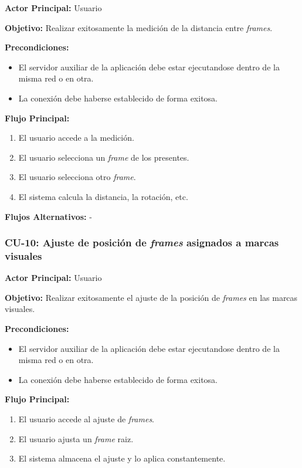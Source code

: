 \textbf{Actor Principal:} Usuario

\textbf{Objetivo:}
Realizar exitosamente la medición de la distancia entre \textit{frames}.

\textbf{Precondiciones:}
\begin{itemize}
    \item El servidor auxiliar de la aplicación debe estar ejecutandose dentro de la misma red o en otra. 
    \item La conexión debe haberse establecido de forma exitosa.
\end{itemize}

\textbf{Flujo Principal:}
\begin{enumerate}
    \item El usuario accede a la medición.
    \item El usuario selecciona un \textit{frame} de los presentes.
    \item El usuario selecciona otro \textit{frame}.
    \item El sistema calcula la distancia, la rotación, etc.
\end{enumerate}

\textbf{Flujos Alternativos:}
-

\subsubsection{CU-10: Ajuste de posición de \textit{frames} asignados a marcas visuales}

\textbf{Actor Principal:} Usuario

\textbf{Objetivo:}
Realizar exitosamente el ajuste de la posición de \textit{frames} en las marcas visuales.

\textbf{Precondiciones:}
\begin{itemize}
    \item El servidor auxiliar de la aplicación debe estar ejecutandose dentro de la misma red o en otra. 
    \item La conexión debe haberse establecido de forma exitosa.
\end{itemize}

\textbf{Flujo Principal:}
\begin{enumerate}
    \item El usuario accede al ajuste de \textit{frames}.  
    \item El usuario ajusta un \textit{frame} raiz.
    \item El sistema almacena el ajuste y lo aplica constantemente.
\end{enumerate}

